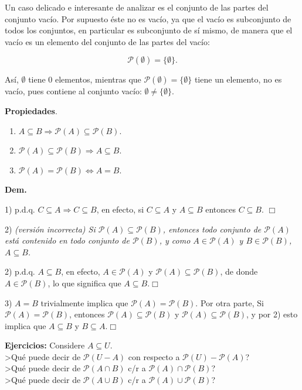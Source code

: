 Un caso delicado e interesante de analizar es el conjunto 
de las partes del conjunto vacío. 
Por supuesto \'este no es vacío, 
ya que el vacío es subconjunto de todos los conjuntos, 
en particular es subconjunto de sí mismo, 
de manera que el vacío es un elemento del conjunto de las partes del vacío:

$$\mathcal{P}(\emptyset)=  \{ \emptyset \}.$$

Así, $\emptyset$ tiene 0 elementos, 
mientras que $\mathcal{P}(\emptyset)=  \{ \emptyset \}$ 
tiene un elemento, no es vacío, 
pues contiene al conjunto vacío: $\emptyset\not = \{ \emptyset\}$.

\textbf{ Propiedades}.
\begin{enumerate}
\item $A\subseteq B \Rightarrow \mathcal{P}(A)\subseteq \mathcal{P}(B)$.
\item $\mathcal{P}(A)\subseteq \mathcal{P}(B) \Rightarrow A\subseteq B$.
\item $\mathcal{P}(A)= \mathcal{P}(B) \Leftrightarrow A= B$.
\end{enumerate}
\textbf{ Dem.}

1) p.d.q. $C\subseteq A \Rightarrow C\subseteq B$, en efecto, 
si $C\subseteq A$ y $A\subseteq B$ entonces $C\subseteq B$. $\Box$

2) {\em (versi\'on incorrecta) Si $\mathcal{P}(A)\subseteq \mathcal{P}(B)$, 
	entonces todo conjunto de $\mathcal{P}(A)$ est\'a contenido en todo 
	conjunto de $\mathcal{P}(B)$, y como $A\in \mathcal{P}(A)$ y $B\in \mathcal{P}(B)$,  
	$A\subseteq B$.}

2) p.d.q. $A\subseteq B$, en efecto, $A\in \mathcal{P}(A)$ y $\mathcal{P}(A)\subseteq \mathcal{P}(B)$, 
de donde $A\in \mathcal{P}(B)$, lo que significa que $A\subseteq B$.$\Box$

3) $A=B$ trivialmente implica que $\mathcal{P}(A)= \mathcal{P}(B)$. Por otra parte,
Si $\mathcal{P}(A)= \mathcal{P}(B)$, entonces $\mathcal{P}(A)\subseteq \mathcal{P}(B)$ y 
$\mathcal{P}(A)\subseteq \mathcal{P}(B)$, y por 2) esto implica que $A\subseteq B$ y 
$B\subseteq A$.$\Box$

\textbf{ Ejercicios:}
Considere $A\subseteq U$.\\ 
>Qu\'e puede decir de $\mathcal{P}(U-A)$ con respecto a $\mathcal{P}(U)-\mathcal{P}(A)$?\\
>Qu\'e puede decir de $\mathcal{P}(A\cap B)$ c/r a $\mathcal{P}(A)\cap \mathcal{P}(B)$?\\
>Qu\'e puede decir de $\mathcal{P}(A\cup B)$ c/r a $\mathcal{P}(A)\cup \mathcal{P}(B)$?\\



